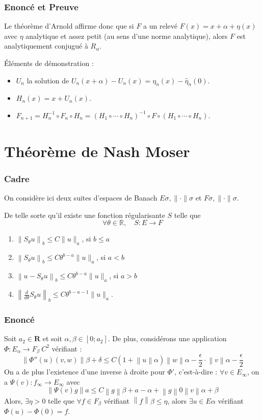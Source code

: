 \documentclass[10pt]{beamer}
\begin{document}
\begin{frame}
\frametitle{Enoncé et Preuve}
Le théorème d'Arnold affirme donc que si \( F \) a un relevé \( F(x) = x + \alpha + \eta (x) \) avec \( \eta \) analytique et assez petit (au sens d'une norme analytique), alors \( F \) est analytiquement conjugué à \( R_\alpha \).

Éléments de démonstration :
\begin{itemize}
    \item \( U_n \) la solution de \( U_n(x+\alpha)-U_n(x)=\eta_n(x)-\hat{\eta}_n(0) \).
    \item \( H_n(x)=x+U_n(x) \).
    \item \( F_{n+1}=H_n^{-1} \circ F_n \circ H_n=\left(H_1 \circ \cdots \circ H_n\right)^{-1} \circ F \circ\left(H_1 \circ \cdots \circ H_n\right) \).
\end{itemize}
\end{frame}
\section{Théorème de Nash Moser}
\begin{frame}
\frametitle{Cadre}
On considère ici deux suites d'espaces de Banach ${E}\sigma, \lVert \cdot \rVert\sigma$ et ${F}\sigma, \lVert \cdot \rVert\sigma$.

De telle sorte qu'il existe une fonction régularisante $S$ telle que 
\[
\forall \theta \in \mathbb{R}, \quad S : E \to F 
\]

\begin{enumerate}
    \item $\left\|S_\theta u\right\|_b \leq C\|u\|_a$, si $b \leq a$
    \item $\left\|S_\theta u\right\|_b \leq C \theta^{b-a}\|u\|_a$, si $a < b$
    \item $\left\|u-S_\theta u\right\|_b \leq C \theta^{b-a}\|u\|_a$, si $a > b$
    \item $\left\|\frac{d}{d \theta} S_\theta u\right\|_b \leq C \theta^{b-a-1}\|u\|_a$.
\end{enumerate}
\end{frame}

\begin{frame}
\frametitle{Enoncé }
Soit $a_2 \in \mathbf{R}$ et soit $\alpha , \beta \in [0;a_2 ]$.
De plus, considérons une application $\Phi : E_\alpha \to F_\beta \: C^2 $ vérifiant :
\[ \left\|\Phi '' (u)(v,w) \right\|{\beta + \delta} \leq C ( 1 +\left\|u \right\|\alpha ) \left\|w \right\|{\alpha - \frac{\epsilon}{2} } \cdot \left\| v \right\|{\alpha - \frac{\epsilon}{2}} \]  
On a de plus l'existence d'une inverse à droite pour $\Phi' $, c'est-à-dire :
$\forall v \in E_\infty$, on a $\Psi (v): f_\infty \to E_\infty $ avec 
\[ \left\| \Psi(v)g \right\|a \leq C \left\| g \right\|{\beta + a - \alpha }+ \left\| g \right\|0 \left\| v \right\|{\alpha + \beta} \]
Alors, $\exists \eta > 0 $ telle que $\forall f \in F_\beta$ vérifiant $ \left\| f \right\|\beta \leq \eta$, alors $\exists u \in E\alpha$ vérifiant $ \Phi(u)-\Phi(0)=f$.
\end{frame}
\end{document}
